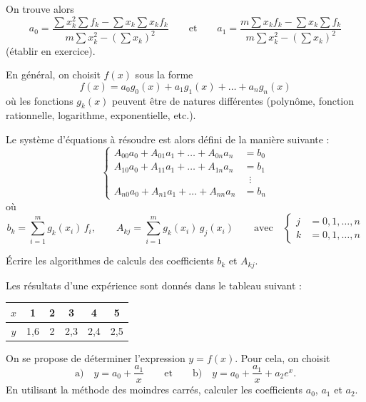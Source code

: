 On trouve alors
\[
  a_0 = \frac{\sum x_k^2\sum f_k - \sum x_k\sum x_kf_k}{m\sum x_k^2 - \left(\sum x_k\right)^2}
  \qquad\text{et}\qquad
  a_1 = \frac{m\sum x_kf_k - \sum x_k\sum f_k}{m\sum x_k^2 - \left(\sum x_k\right)^2}
\]
(établir en exercice).

En général, on choisit $f(x)$ sous la forme
\[
  f(x) = a_0g_0(x) + a_1g_1(x) + \dots + a_ng_n(x)
\]
où les fonctions $g_k(x)$ peuvent être de natures différentes (polynôme,
fonction rationnelle, logarithme, exponentielle, etc.).

Le système d'équations à résoudre est alors défini de la manière suivante :
\[
  \left\{
  \begin{aligned}
    A_{00}a_0 + A_{01}a_1 + \dots + A_{0n}a_n &= b_0\\
    A_{10}a_0 + A_{11}a_1 + \dots + A_{1n}a_n &= b_1\\
    &\;\;\vdots\\
    A_{n0}a_0 + A_{n1}a_1 + \dots + A_{nn}a_n &= b_n
  \end{aligned}
  \right.
\]
où
\[
  b_k = \sum_{i=1}^{m} g_k(x_i)\,f_i, \qquad
  A_{kj} = \sum_{i=1}^{m} g_k(x_i)\,g_j(x_i)
  \qquad\text{avec}\quad
  \left\{
  \begin{aligned}
    j &= 0, 1, \dots, n\\
    k &= 0, 1, \dots, n
  \end{aligned}
  \right.
\]

\begin{exercice}[Exercice 1]
Écrire les algorithmes de calculs des coefficients $b_k$ et $A_{kj}$.
\end{exercice}

\begin{exercice}[Exercice 2]
Les résultats d'une expérience sont donnés dans le tableau suivant :
\begin{center}
  \begin{tabular}{|c|c|c|c|c|c|}
    \hline
    $x$ & 1 & 2 & 3 & 4 & 5\\ \hline
    $y$ & 1,6 & 2 & 2,3 & 2,4 & 2,5\\ \hline
  \end{tabular}
\end{center}
On se propose de déterminer l'expression $y = f(x)$. Pour cela, on choisit
\[
  \text{a)}\quad y = a_0 + \frac{a_1}{x}
  \qquad\text{et}\qquad
  \text{b)}\quad y = a_0 + \frac{a_1}{x} + a_2e^{x} .
\]
En utilisant la méthode des moindres carrés, calculer les coefficients $a_0$,
$a_1$ et $a_2$.
\end{exercice}

